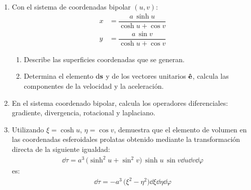 \documentclass[hidelinks,12pt]{article}
\def\scaleint#1{\vcenter{\hbox{\scaleto[3ex]{\displaystyle\int}{#1}}}}
\def\bs{\mkern-12mu}
\begin{document}
\begin{enumerate}
\item Con el sistema de coordenadas bipolar $(u, v)$:
\begin{align*}
x &= \dfrac{a \, \sinh u}{\cosh u + \cos v} \\[0.5em]
y &= \dfrac{a \, \sin v}{\cosh u + \cos v}
\end{align*}
\begin{enumerate}[label=\alph*)]
\item Describe las superficies coordenadas que se generan.
\item \label{inciso_1_b} Determina el elemento $\dd{\vb{s}}$ y de los vectores unitarios $\vu{e}$, calcula las componentes de la velocidad y la aceleración.
\end{enumerate}
\item En el sistema coordenado bipolar, calcula los operadores diferenciales: gradiente, divergencia, rotacional y laplaciano.
\item Utilizando $\xi = \cosh u$, $\eta = \cos v$, demuestra que el elemento de volumen en las coordenadas esferoidales prolatas obtenido mediante la transformación directa de la siguiente igualdad:
\begin{align*}
\dd{\tau} = a^{3} \, \big( \sinh^{2} u + \sin^{2} v \big) \, \sinh u \, \sin v \dd{u} \dd{v} \dd{\varphi}
\end{align*}
es:
\begin{align*}
\dd{\tau} = - a^{3} \, \big( \xi^{2} - \eta^{2} \big) \dd{\xi} \dd{\eta} \dd{\varphi}
\end{align*}

\end{enumerate}
\end{document}
